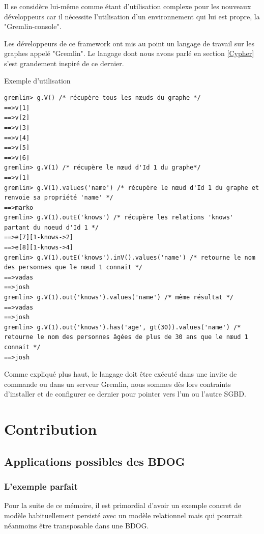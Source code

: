 \documentclass[a4paper,fleqn,12pt]{report}
\begin{document}
Il se considère lui-même comme étant d’utilisation complexe pour les nouveaux développeurs car il nécessite l’utilisation d’un environnement qui lui est propre, la "Gremlin-console".

Les développeurs de ce framework ont mis au point un langage de travail sur les graphes appelé "Gremlin". Le langage dont nous avons parlé en section \ref{Cypher} s’est grandement inspiré de ce dernier.

Exemple d’utilisation

\begin{lstlisting}
gremlin> g.V() /* récupère tous les nœuds du graphe */
==>v[1]
==>v[2]
==>v[3]
==>v[4]
==>v[5]
==>v[6]
gremlin> g.V(1) /* récupère le nœud d'Id 1 du graphe*/
==>v[1]
gremlin> g.V(1).values('name') /* récupère le nœud d'Id 1 du graphe et renvoie sa propriété 'name' */
==>marko
gremlin> g.V(1).outE('knows') /* récupère les relations 'knows' partant du noeud d'Id 1 */
==>e[7][1-knows->2]
==>e[8][1-knows->4]
gremlin> g.V(1).outE('knows').inV().values('name') /* retourne le nom des personnes que le nœud 1 connait */
==>vadas
==>josh
gremlin> g.V(1).out('knows').values('name') /* même résultat */
==>vadas
==>josh
gremlin> g.V(1).out('knows').has('age', gt(30)).values('name') /* retourne le nom des personnes âgées de plus de 30 ans que le nœud 1 connait */
==>josh
\end{lstlisting}

Comme expliqué plus haut, le langage doit être exécuté dans une invite de commande ou dans un serveur Gremlin, nous sommes dès lors contraints d’installer et de configurer ce dernier pour pointer vers l’un ou l’autre SGBD.



\part{Contribution}
\chapter{Applications possibles des BDOG}

\section{L'exemple parfait}

Pour la suite de ce mémoire, il est primordial d'avoir un exemple concret de modèle habituellement persisté avec un modèle relationnel mais qui pourrait néanmoins être transposable dans une BDOG.
\end{document}
